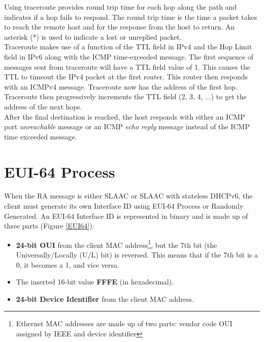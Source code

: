 Using traceroute provides round trip time for each hop along the path and indicates if a hop fails to respond. The round trip time is the time a packet takes to reach the remote host and for the response from the host to return. An asterisk (*) is used to indicate a lost or unreplied packet.\\

Traceroute makes use of a function of the TTL field in IPv4 and the Hop Limit field in IPv6 along with the ICMP time-exceeded message. The first sequence of messages sent from traceroute will have a TTL field value of 1. This causes the TTL to timeout the IPv4 packet at the first router. This router then responds with an ICMPv4 message. Traceroute now has the address of the first hop. Traceroute then progressively increments the TTL field (2, 3, 4, ...) to get the address of the next hops.\\

After the final destination is reached, the host responds with either an ICMP port \emph{unreachable} message or an ICMP \emph{echo reply} message instead of the ICMP time exceeded message.

\section{EUI-64 Process}

When the RA message is either SLAAC or SLAAC with stateless DHCPv6, the client must generate its own Interface ID using EUI-64 Process or Randomly Generated. An EUI-64 Interface ID is represented in binary and is made up of three parts (Figure \ref{EUI64}):

\begin{itemize}
\item \textbf{24-bit OUI} from the client MAC address\footnote{Ethernet MAC addresses are made up of two parts: vendor code OUI assigned by IEEE and device identifier}, but the 7th bit (the Universally/Locally (U/L) bit) is reversed. This means that if the 7th bit is a 0, it becomes a 1, and vice versa.
\item The inserted 16-bit value \textbf{FFFE} (in hexadecimal).
\item \textbf{24-bit Device Identifier} from the client MAC address.
\end{itemize}

